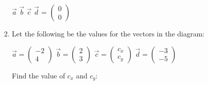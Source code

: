 \documentclass[12pt, twoside]{article}
\begin{document}
\begin{enumerate}
\begin{enumerate}
        \vspace{1cm}
    
        \begin{center}
            $\vec{a}$ \hspace{.4cm} $\vec{b}$ \hspace{.4cm} $\vec{c}$ \hspace{.4cm} $\vec{d}$ \hspace{.2cm} = \hspace{.2cm} $\begin{pmatrix} 0\\ 0\end{pmatrix}$
        \end{center}

        \vspace{1cm}

        \item Let the following be the values for the vectors in the diagram:
        
        \vspace{2cm}
        
        \begin{center}
        $\vec{a} = \begin{pmatrix} -2\\ 4\end{pmatrix}$ \hspace{1cm}
        $\vec{b} = \begin{pmatrix} 2\\ 3\end{pmatrix}$ \hspace{1cm}
        $\vec{c} = \begin{pmatrix} c_x\\ c_y\end{pmatrix}$ \hspace{1cm}
        $\vec{d} = \begin{pmatrix} -3\\ -5\end{pmatrix}$
        \end{center}

        \vspace{1cm}

        Find the value of $c_x$ and $c_y$:

        \vspace{2cm}

    \end{enumerate}

    \newpage
    

\end{enumerate}
\end{document}
